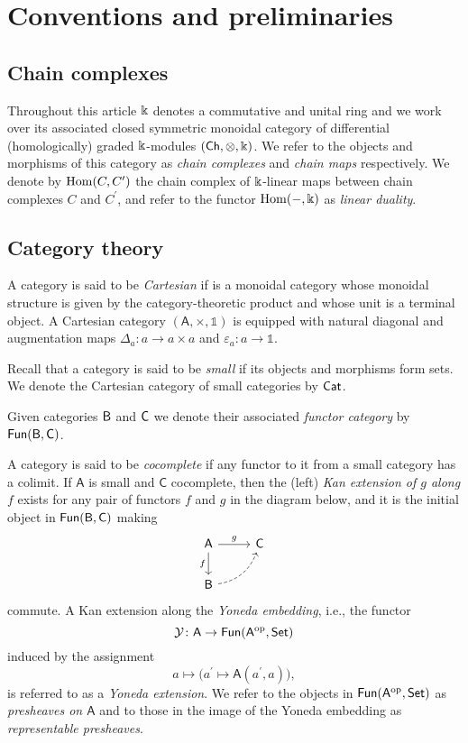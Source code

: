 
\section{Conventions and preliminaries} \label{s:preliminaries}

\subsection{Chain complexes }

Throughout this article $\Bbbk$ denotes a commutative and unital ring and we work over its associated closed symmetric monoidal category of differential (homologically) graded $\Bbbk$-modules $(\mathsf{Ch}, \otimes, \Bbbk)$.
We refer to the objects and morphisms of this category as \textit{chain complexes} and \textit{chain maps} respectively. We denote by $\mathrm{Hom}(C, C^\prime)$ the chain complex of $\Bbbk$-linear maps between chain complexes $C$ and $C^\prime$, and refer to the functor $\mathrm{Hom}(-, \Bbbk)$ as \textit{linear duality}.

\subsection{Category theory}

A category is said to be \textit{Cartesian} if is a monoidal category whose monoidal structure is given by the category-theoretic product and whose unit is a terminal object.
A Cartesian category $(\mathsf{A}, \times, \mathbb{1})$ is equipped with natural diagonal and augmentation maps $\Delta_a \colon a \to a \times a$ and $\varepsilon_a \colon a \to \mathbb{1}$.

Recall that a category is said to be \textit{small} if its objects and morphisms form sets.
We denote the Cartesian category of small categories by $\mathsf{Cat}$.

Given categories $\mathsf{B}$ and $\mathsf{C}$ we denote their associated \textit{functor category} by $\mathsf{Fun}(\mathsf{B}, \mathsf{C})$.

A category is said to be \textit{cocomplete} if any functor to it from a small category has a colimit.
If $\mathsf{A}$ is small and $\mathsf{C}$ cocomplete, then the (left) \textit{Kan extension of $g$ along $f$} exists for any pair of functors $f$ and $g$ in the diagram below, and it is the initial object in $\mathsf{Fun}(\mathsf{B}, \mathsf{C})$ making
\begin{equation*}
\begin{tikzcd}[column sep=normal, row sep=normal]
\mathsf{A} \arrow[d, "f"'] \arrow[r, "g"] & \mathsf{C} \\
\sB \arrow[dashed, ur, bend right] & \quad
\end{tikzcd}
\end{equation*}
commute.
A Kan extension along the \textit{Yoneda embedding}, i.e., the functor
\[
\mathcal{Y} \colon \mathsf{A} \to \mathsf{Fun}(\mathsf{A}^{\mathrm{op}}, \mathsf{Set})
\]
induced by the assignment
\[
a \mapsto \big( a^\prime \mapsto \mathsf{A}(a^\prime, a) \big),
\]
is referred to as a \textit{Yoneda extension}.
We refer to the objects in $\mathsf{Fun}(\mathsf{A}^{\mathrm{op}}, \mathsf{Set})$ as \textit{presheaves on $\mathsf{A}$} and to those in the image of the Yoneda embedding as \textit{representable presheaves}.

